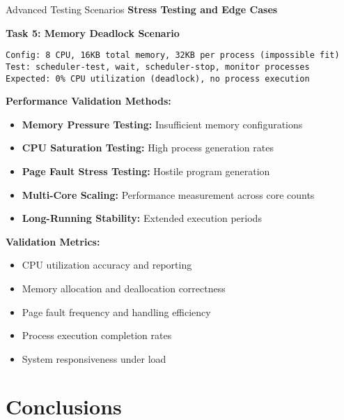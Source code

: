 \documentclass[10pt]{beamer}
\begin{document}
\begin{frame}[fragile]{Advanced Testing Scenarios}
    \textbf{Stress Testing and Edge Cases}
    
    \textbf{Task 5: Memory Deadlock Scenario}
    \begin{lstlisting}[basicstyle=\ttfamily\tiny]
Config: 8 CPU, 16KB total memory, 32KB per process (impossible fit)
Test: scheduler-test, wait, scheduler-stop, monitor processes
Expected: 0% CPU utilization (deadlock), no process execution
    \end{lstlisting}
    
    \vspace{0.5cm}
    \textbf{Performance Validation Methods:}
    \begin{itemize}
        \item \textbf{Memory Pressure Testing:} Insufficient memory configurations
        \item \textbf{CPU Saturation Testing:} High process generation rates
        \item \textbf{Page Fault Stress Testing:} Hostile program generation
        \item \textbf{Multi-Core Scaling:} Performance measurement across core counts
        \item \textbf{Long-Running Stability:} Extended execution periods
    \end{itemize}
    
    \vspace{0.3cm}
    \textbf{Validation Metrics:}
    \begin{itemize}
        \item CPU utilization accuracy and reporting
        \item Memory allocation and deallocation correctness
        \item Page fault frequency and handling efficiency
        \item Process execution completion rates
        \item System responsiveness under load
    \end{itemize}
\end{frame}

\section{Conclusions}
\end{document}
